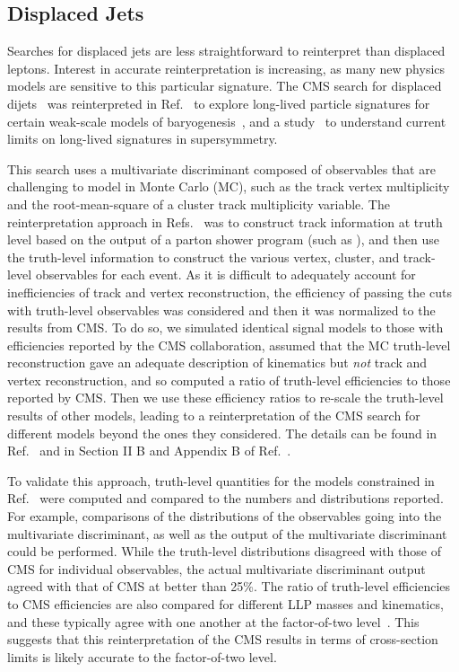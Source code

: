 \subsection{Displaced Jets}
\label{displacedJets}

Searches for displaced jets are less straightforward to reinterpret than
displaced leptons. Interest in accurate reinterpretation is increasing, as many
new physics models are sensitive to this particular signature. The CMS search for 
displaced dijets~\cite{CMS-PAS-EXO-12-038} was reinterpreted in Ref.~\cite{Cui:2014twa} to explore 
long-lived particle signatures for certain weak-scale models of 
baryogenesis~\cite{Cui:2012jh,Cui:2013bta,Cui:2014twa}, and a study~\cite{Liu:2015bma} to 
understand current limits on long-lived signatures in supersymmetry.

This search uses a multivariate discriminant composed of observables that are
challenging to model in Monte Carlo (MC), such as the track vertex multiplicity
and the root-mean-square of a cluster track multiplicity variable. The
reinterpretation approach in Refs.~\cite{Cui:2014twa,Liu:2015bma} was to construct track
information at truth level based on the output of a parton shower program (such
as {}), and then use the truth-level information to construct the
various vertex, cluster, and track-level observables for each event. As it is
difficult to adequately account for inefficiencies of track and vertex
reconstruction, the efficiency of passing the cuts with truth-level observables
was considered and then it was normalized to the results from CMS. To do so, we
simulated identical signal models to those with efficiencies reported by the CMS
collaboration, assumed that the MC truth-level reconstruction gave an adequate
description of kinematics but \emph{not} track and vertex reconstruction, and so
computed a ratio of truth-level efficiencies to those reported by CMS. Then we
use these efficiency ratios to re-scale the truth-level results of other models,
leading to a reinterpretation of the CMS search for different models beyond the
ones they considered. The details can be found in Ref.~\cite{Cui:2014twa} and in 
Section II B and Appendix B of Ref.~\cite{Liu:2015bma}.

To validate this approach, truth-level quantities for the models constrained in
Ref.~\cite{CMS-PAS-EXO-12-038} were computed and compared to the numbers and
distributions reported. For example,
comparisons of the distributions of the observables going into the multivariate
discriminant, as well as the output of the multivariate discriminant could be
performed. While the truth-level distributions disagreed with those of CMS for
individual observables, the actual multivariate discriminant output agreed with
that of CMS at better than 25\%. The ratio of truth-level efficiencies to CMS
efficiencies are also compared for different LLP masses and kinematics, and
these typically agree with one another at the factor-of-two
level~\cite{Cui:2014twa}. This suggests that this reinterpretation of the CMS
results in terms of cross-section limits is likely accurate to the factor-of-two level.

